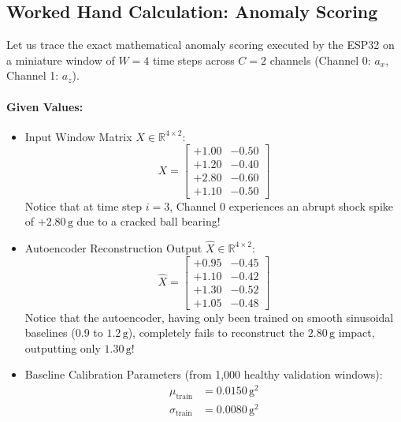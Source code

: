 \subsection{Worked Hand Calculation: Anomaly Scoring}\label{subsec:p3_worked_example}

\begin{example}
Let us trace the exact mathematical anomaly scoring executed by the ESP32 on a miniature window of $W = 4$ time steps across $C = 2$ channels (Channel 0: $a_x$, Channel 1: $a_z$).

\paragraph{Given Values:}
\begin{itemize}
    \item Input Window Matrix $X \in \mathbb{R}^{4 \times 2}$:
    \begin{equation*}
    X = \begin{bmatrix}
    +1.00 & -0.50 \\
    +1.20 & -0.40 \\
    +2.80 & -0.60 \\
    +1.10 & -0.50
    \end{bmatrix}
    \end{equation*}
    Notice that at time step $i = 3$, Channel 0 experiences an abrupt shock spike of $+2.80\,\text{g}$ due to a cracked ball bearing!
    \item Autoencoder Reconstruction Output $\hat{X} \in \mathbb{R}^{4 \times 2}$:
    \begin{equation*}
    \hat{X} = \begin{bmatrix}
    +0.95 & -0.45 \\
    +1.10 & -0.42 \\
    +1.30 & -0.52 \\
    +1.05 & -0.48
    \end{bmatrix}
    \end{equation*}
    Notice that the autoencoder, having only been trained on smooth sinusoidal baselines ($0.9$ to $1.2\,\text{g}$), completely fails to reconstruct the $2.80\,\text{g}$ impact, outputting only $1.30\,\text{g}$!
    \item Baseline Calibration Parameters (from 1,000 healthy validation windows):
    \begin{align*}
    \mu_{\text{train}} &= 0.0150\,\text{g}^2 \\
    \sigma_{\text{train}} &= 0.0080\,\text{g}^2
    \end{align*}
\end{itemize}


\end{example}
